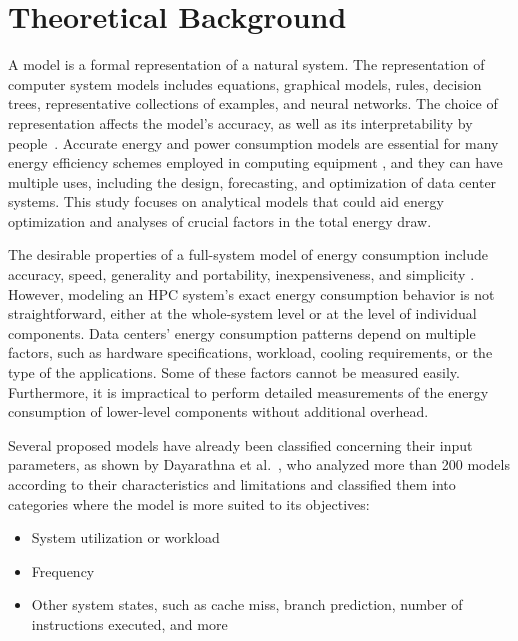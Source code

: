 
\section{Theoretical Background} \label{sec:theoretical_background}

A model is a formal representation of a natural system. The representation of computer system models includes equations, graphical models, rules, decision trees, representative collections of examples, and neural networks. The choice of representation affects the model's accuracy, as well as its interpretability by people~\cite{Hypothesis2012EncyclopediaLearning, Roy2019ForecastingNetwork, Zhu2019PredictingLearning}. Accurate energy and power consumption models are essential for many energy efficiency schemes employed in computing equipment \cite{Rivoire2007ModelsOptimizations}, and they can have multiple uses, including the design, forecasting, and optimization of data center systems. This study focuses on analytical models that could aid energy optimization and analyses of crucial factors in the total energy draw.

The desirable properties of a full-system model of energy consumption include accuracy, speed, generality and portability, inexpensiveness, and simplicity \cite{Rivoire2008AModels}. However, modeling an HPC system's exact energy consumption behavior is not straightforward, either at the whole-system level or at the level of individual components. Data centers' energy consumption patterns depend on multiple factors, such as hardware specifications, workload, cooling requirements, or the type of the applications. Some of these factors cannot be measured easily. Furthermore, it is impractical to perform detailed measurements of the energy consumption of lower-level components without additional overhead.

Several proposed models have already been classified concerning their input parameters, as shown by Dayarathna et al.~\cite{Dayarathna2016DataSurvey}, who analyzed more than 200 models according to their characteristics and limitations and classified them into categories where the model is more suited to its objectives:
\begin{itemize}
	\item System utilization or workload
	\item Frequency
	\item Other system states, such as cache miss, branch prediction, number of instructions executed, and more
	\label{tab:input_type}
\end{itemize}

